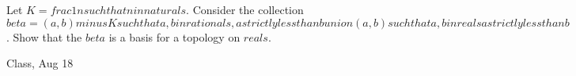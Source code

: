 \begin{samepage}
\begin{ex}
    Let $K = {{ frac{1}{n} such that n in naturals }}$. Consider the collection $beta = {{ (a, b) minus K such that a,b in rationals, a strictly less than b }} union {{ (a,b) such that a,b in reals a strictly less than b }}$.  Show that the $beta$ is a basis for a topology on $reals$.
\end{ex}
\begin{source}
Class, Aug 18
\end{source}
\end{samepage}
